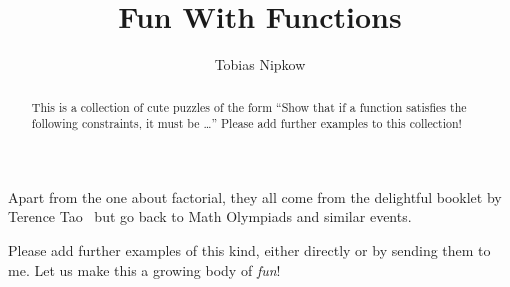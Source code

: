 \documentclass[11pt,a4paper]{article}
\begin{document}
\title{Fun With Functions}
\author{Tobias Nipkow}
\maketitle

\begin{abstract}
This is a collection of cute puzzles of the form ``Show that if a function
satisfies the following constraints, it must be \dots''
Please add further examples to this collection!
\end{abstract}

Apart from the one about factorial, they all come from the delightful booklet
by Terence Tao~\cite{Tao2006} but go back to Math Olympiads and similar
events.

Please add further examples of this kind, either directly or by sending them
to me. Let us make this a growing body of \emph{fun}!





\end{document}
